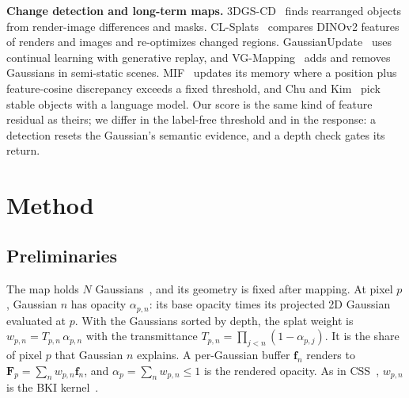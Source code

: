 \documentclass[journal]{IEEEtran}
\begin{document}
\textbf{Change detection and long-term maps.} 3DGS-CD~\cite{lu2025gscd} finds rearranged objects from render-image differences and masks. CL-Splats~\cite{ackermann2025clsplats} compares DINOv2 features of renders and images and re-optimizes changed regions. GaussianUpdate~\cite{zeng2025gaussianupdate} uses continual learning with generative replay, and VG-Mapping~\cite{he2026vgmapping} adds and removes Gaussians in semi-static scenes. MIF~\cite{jiang2026mif} updates its memory where a position plus feature-cosine discrepancy exceeds a fixed threshold, and Chu and Kim~\cite{chu2026semantic} pick stable objects with a language model. Our score is the same kind of feature residual as theirs; we differ in the label-free threshold and in the response: a detection resets the Gaussian's semantic evidence, and a depth check gates its return.

\section{Method}
\label{sec:method}
\subsection{Preliminaries}
\label{sec:prelim}
The map holds $N$ Gaussians~\cite{kerbl2023}, and its geometry is fixed after mapping. At pixel $p$, Gaussian $n$ has opacity $\alpha_{p,n}$: its base opacity times its projected 2D Gaussian evaluated at $p$. With the Gaussians sorted by depth, the splat weight is $w_{p,n}=T_{p,n}\,\alpha_{p,n}$ with the transmittance $T_{p,n}=\prod_{j<n}(1-\alpha_{p,j})$. It is the share of pixel $p$ that Gaussian $n$ explains. A per-Gaussian buffer $\mathbf{f}_n$ renders to $\mathbf{F}_p=\sum_n w_{p,n}\mathbf{f}_n$, and $\alpha_p=\sum_n w_{p,n}\le1$ is the rendered opacity. As in CSS~\cite{wilson2025css}, $w_{p,n}$ is the BKI kernel~\cite{vegabrown2014, gan2020bayesian}.
\end{document}
